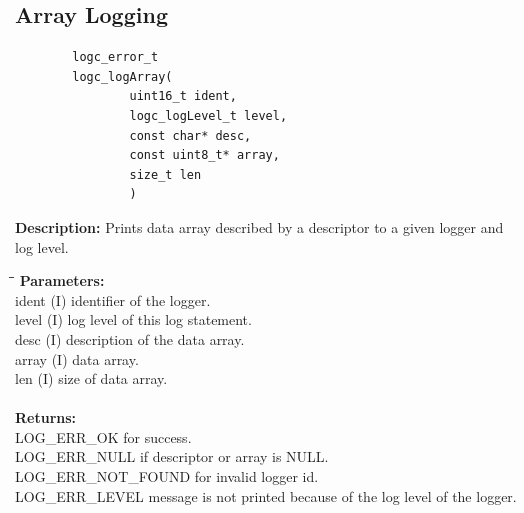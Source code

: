 \documentclass[a4paper, titlepage, 11pt]{article}
\begin{document}
\newpage

\subsection{Array Logging}

\small
\begin{verbatim}
        logc_error_t
        logc_logArray(
                uint16_t ident,
                logc_logLevel_t level,
                const char* desc,
                const uint8_t* array,
                size_t len
                )
\end{verbatim}
\normalsize
\textbf{Description:} Prints data array described by a descriptor to a given logger and log level.
\begin{tabbing}
\hspace*{1cm}\=\hspace*{2cm}\=\hspace*{0,6cm}\= \kill
\textbf{Parameters:} \\
\> ident \> (I) identifier of the logger. \\
\> level \> (I) log level of this log statement. \\
\> desc \> (I) description of the data array. \\
\> array \> (I) data array. \\
\> len \> (I) size of data array. \\ \\
\textbf{Returns:} \\
\> LOG\_ERR\_OK for success. \\
\> LOG\_ERR\_NULL if descriptor or array is NULL. \\
\> LOG\_ERR\_NOT\_FOUND for invalid logger id. \\
\> LOG\_ERR\_LEVEL message is not printed because of the log level of the logger. \\ \\ \\
\end{tabbing}
\end{document}
